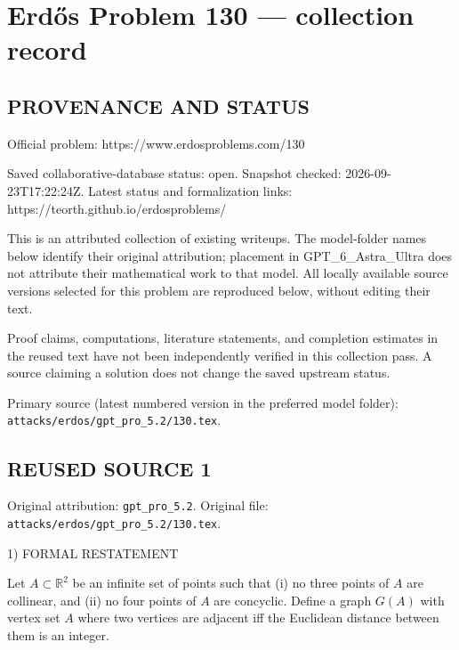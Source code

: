 \section*{Erd\H{o}s Problem 130 --- collection record}

\subsection*{PROVENANCE AND STATUS}
Official problem: https://www.erdosproblems.com/130

Saved collaborative-database status: open.
Snapshot checked: 2026-09-23T17:22:24Z.
Latest status and formalization links: https://teorth.github.io/erdosproblems/

This is an attributed collection of existing writeups. The model-folder names below identify their original attribution; placement in GPT\_6\_Astra\_Ultra does not attribute their mathematical work to that model. All locally available source versions selected for this problem are reproduced below, without editing their text.

Proof claims, computations, literature statements, and completion estimates in the reused text have not been independently verified in this collection pass. A source claiming a solution does not change the saved upstream status.

Primary source (latest numbered version in the preferred model folder): \texttt{attacks/erdos/gpt\_pro\_5.2/130.tex}.

\subsection*{REUSED SOURCE 1}
Original attribution: \texttt{gpt\_pro\_5.2}.
Original file: \texttt{attacks/erdos/gpt\_pro\_5.2/130.tex}.


1) FORMAL RESTATEMENT

Let $A\subset\mathbb{R}^2$ be an infinite set of points such that
(i) no three points of $A$ are collinear, and
(ii) no four points of $A$ are concyclic.
Define a graph $G(A)$ with vertex set $A$ where two vertices are adjacent iff the Euclidean distance between them is an integer.

